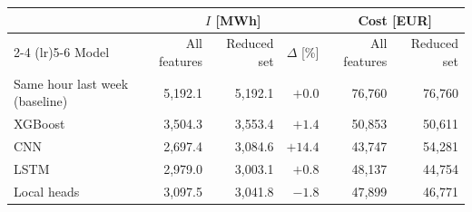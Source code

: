 \begin{tabular}{lrrrrr}
\toprule
 & \multicolumn{3}{c}{$I$ [MWh]} & \multicolumn{2}{c}{Cost [EUR]} \\
\cmidrule(lr){2-4} \cmidrule(lr){5-6}
Model & All features & Reduced set & $\Delta$ [\%] & All features & Reduced set \\
\midrule
Same hour last week (baseline) & 5,192.1 & 5,192.1 & $+0.0$ & 76,760 & 76,760 \\
XGBoost & 3,504.3 & 3,553.4 & $+1.4$ & 50,853 & 50,611 \\
CNN & 2,697.4 & 3,084.6 & $+14.4$ & 43,747 & 54,281 \\
LSTM & 2,979.0 & 3,003.1 & $+0.8$ & 48,137 & 44,754 \\
Local heads & 3,097.5 & 3,041.8 & $-1.8$ & 47,899 & 46,771 \\
\bottomrule
\end{tabular}
